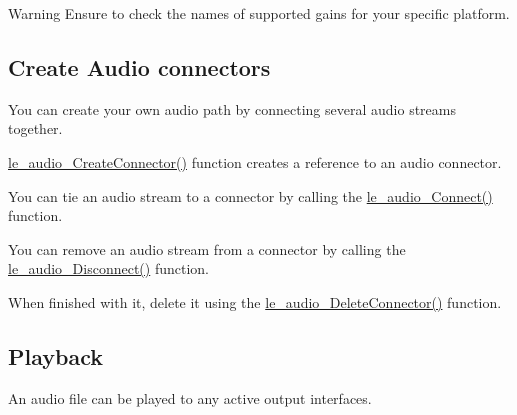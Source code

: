 \begin{DoxyWarning}{Warning}
Ensure to check the names of supported gains for your specific platform.
\end{DoxyWarning}
\hypertarget{c_audio_le_audio_connectors}{}\subsection{Create Audio connectors}\label{c_audio_le_audio_connectors}
You can create your own audio path by connecting several audio streams together.

\hyperlink{le__audio__interface_8h_a570aaf85086f00aca592acfbaaa237be}{le\+\_\+audio\+\_\+\+Create\+Connector()} function creates a reference to an audio connector.

You can tie an audio stream to a connector by calling the \hyperlink{le__audio__interface_8h_a338df65b2fb1ae0140d86880adbcf0de}{le\+\_\+audio\+\_\+\+Connect()} function.

You can remove an audio stream from a connector by calling the \hyperlink{le__audio__interface_8h_a6b88df9301038375701e4c15a4c8aaf0}{le\+\_\+audio\+\_\+\+Disconnect()} function.

When finished with it, delete it using the \hyperlink{le__audio__interface_8h_a3f40b13ff980040503927f59bb3e86a9}{le\+\_\+audio\+\_\+\+Delete\+Connector()} function.\hypertarget{c_audio_le_audio_pb_playback}{}\subsection{Playback}\label{c_audio_le_audio_pb_playback}
An audio file can be played to any active output interfaces.

